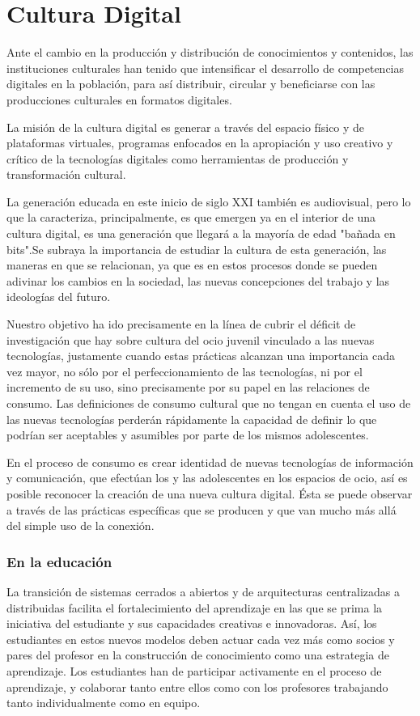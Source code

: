 \section{Cultura Digital}
Ante el cambio en la producción y distribución de conocimientos y contenidos, las instituciones culturales han tenido que intensificar el desarrollo de competencias digitales en la población, para así distribuir, circular y beneficiarse con las producciones culturales en formatos digitales.

La misión de la cultura digital es generar a través del espacio físico y de plataformas virtuales, programas enfocados en la apropiación y uso creativo y crítico de la tecnologías digitales como herramientas de producción y transformación cultural.

La generación educada en este inicio de siglo XXI
también es audiovisual, pero lo que la caracteriza, principalmente, es que emergen ya en el
interior de una cultura digital, es una generación que llegará a la mayoría de edad "bañada en bits".Se subraya la importancia de estudiar la cultura de esta generación, las maneras en que se relacionan, ya que es en estos procesos donde se pueden adivinar los cambios en la sociedad, las nuevas concepciones del trabajo y las ideologías del futuro.

Nuestro objetivo ha ido precisamente en la línea de cubrir el déficit de investigación que hay
sobre cultura del ocio juvenil vinculado a las nuevas tecnologías, justamente cuando estas
prácticas alcanzan una importancia cada vez mayor, no sólo por el perfeccionamiento de las
tecnologías, ni por el incremento de su uso, sino precisamente por su papel en las relaciones
de consumo. Las definiciones de consumo cultural que no tengan en cuenta el uso de las
nuevas tecnologías perderán rápidamente la capacidad de definir lo que podrían
ser aceptables y asumibles por parte de los mismos adolescentes. 

En el proceso de consumo es crear identidad de nuevas tecnologías de información y comunicación, que efectúan los y las adolescentes en los espacios de ocio, así es posible reconocer la creación de una nueva cultura digital. Ésta se puede observar a través de las prácticas específicas que se producen y que van mucho más allá del simple uso de la conexión.

\subsubsection{En la educación}
 La transición de sistemas cerrados a abiertos y de arquitecturas centralizadas a
 distribuidas facilita el fortalecimiento del aprendizaje en las que se prima la iniciativa del estudiante y sus capacidades
 creativas e innovadoras. Así, los estudiantes en estos nuevos modelos deben actuar cada vez más como socios y pares del profesor en la construcción de conocimiento como una estrategia de aprendizaje. Los estudiantes han de participar activamente en el proceso de aprendizaje, y colaborar tanto entre ellos como con los profesores trabajando tanto individualmente como en equipo. 
 
